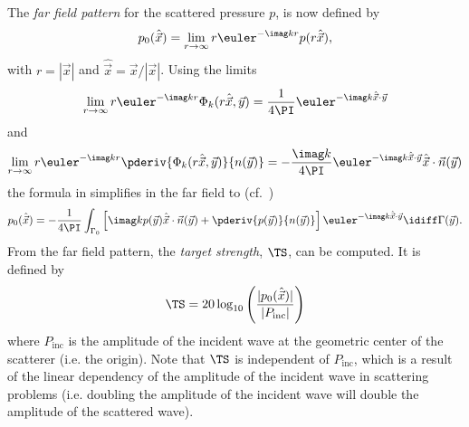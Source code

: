 The \textit{far field pattern} for the scattered pressure $p$, is now defined by
\begin{equation}\label{Eq2:farfield}
	p_0(\hat{\vec{x}}) =  \lim_{r\to\infty} r \euler^{-\imag k r}p(r\hat{\vec{x}}),
\end{equation}
with $r = |\vec{x}|$ and $\hat{\vec{x}} = \vec{x}/|\vec{x}|$. Using the limits
\begin{equation}\label{Eq2:Phi_k_limits1}
	\lim_{r\to\infty} r\euler^{-\imag k r}\Phi_k(r\hat{\vec{x}},\vec{y}) = \frac{1}{4\PI}\euler^{-\imag k \hat{\vec{x}}\cdot\vec{y}}
\end{equation}
and
\begin{equation} \label{Eq2:Phi_k_limits2}
	\lim_{r\to\infty} r\euler^{-\imag k r}\pderiv{\Phi_k(r\hat{\vec{x}},\vec{y})}{n(\vec{y})} = -\frac{\imag k}{4\PI}\euler^{-\imag k \hat{\vec{x}}\cdot\vec{y}}\hat{\vec{x}}\cdot\vec{n}(\vec{y})
\end{equation}
the formula in  simplifies in the far field to (cf.~\cite[p. 32]{Ihlenburg1998fea})
\begin{equation}\label{Eq2:KirchhoffIntegralFarField}
	p_0(\hat{\vec{x}}) = -\frac{1}{4\PI}\int_{\Gamma_0}\left[ \imag k p(\vec{y})\hat{\vec{x}}\cdot\vec{n}(\vec{y}) + \pderiv{p(\vec{y})}{n(\vec{y})}\right]\euler^{-\imag k \hat{\vec{x}}\cdot\vec{y}}\idiff \Gamma(\vec{y}).
\end{equation}
From the far field pattern, the \textit{target strength}, $\TS$, can be computed. It is defined by
\begin{equation}\label{Eq2:TS}
	\TS = 20\log_{10}\left(\frac{|p_0(\hat{\vec{x}})|}{|P_{\mathrm{inc}}|}\right)
\end{equation}
where $P_{\mathrm{inc}}$ is the amplitude of the incident wave at the geometric center of the scatterer (i.e. the origin). Note that $\TS$ is independent of $P_{\mathrm{inc}}$, which is a result of the linear dependency of the amplitude of the incident wave in scattering problems (i.e. doubling the amplitude of the incident wave will double the amplitude of the scattered wave).